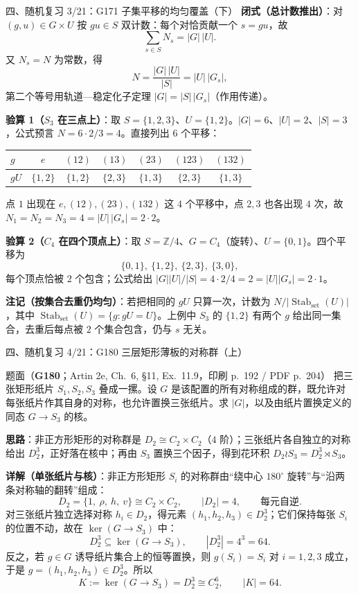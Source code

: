 \documentclass[aspectratio=169,10pt,fontset=none]{ctexbeamer}
\newcommand{\ex}[1]{\textcolor{accent}{\footnotesize\bfseries #1}}
\newcommand{\key}[1]{\textcolor{ink}{\bfseries #1}}
\begin{document}
\begin{frame}[t]{四、随机复习 3/21：G171 子集平移的均匀覆盖（下）}
\scriptsize
\key{闭式（总计数推出）}：对 $(g,u)\in G\times U$ 按 $gu\in S$ 双计数：每个对恰贡献一个 $s=gu$，故
\[ \sum_{s\in S}N_s=|G|\,|U|. \]
又 $N_s=N$ 为常数，得
\[ N=\frac{|G|\,|U|}{|S|}=|U|\,|G_s|, \]
第二个等号用轨道—稳定化子定理 $|G|=|S|\,|G_s|$（作用传递）。

\key{验算 1（$S_3$ 在三点上）}：取 $S=\{1,2,3\}$、$U=\{1,2\}$。$|G|=6$、$|U|=2$、$|S|=3$，公式预言 $N=6\cdot2/3=4$。直接列出 $6$ 个平移：
\begin{center}
{\scriptsize
\begin{tabular}{@{}lcccccc@{}}
\toprule
$g$ & $e$ & $(12)$ & $(13)$ & $(23)$ & $(123)$ & $(132)$\\ \midrule
$gU$ & $\{1,2\}$ & $\{1,2\}$ & $\{2,3\}$ & $\{1,3\}$ & $\{2,3\}$ & $\{1,3\}$\\
\bottomrule
\end{tabular}}
\end{center}
点 $1$ 出现在 $e,(12),(23),(132)$ 这 $4$ 个平移中，点 $2,3$ 也各出现 $4$ 次，故 $N_1=N_2=N_3=4=|U|\,|G_s|=2\cdot2$。

\key{验算 2（$C_4$ 在四个顶点上）}：取 $S=\mathbb Z/4$、$G=C_4$（旋转）、$U=\{0,1\}$。四个平移为
\[ \{0,1\},\ \{1,2\},\ \{2,3\},\ \{3,0\}, \]
每个顶点恰被 $2$ 个包含；公式给出 $|G||U|/|S|=4\cdot2/4=2=|U||G_s|=2\cdot1$。

\key{注记（按集合去重仍均匀）}：若把相同的 $gU$ 只算一次，计数为 $N/|\operatorname{Stab}_{\mathrm{set}}(U)|$，其中 $\operatorname{Stab}_{\mathrm{set}}(U)=\{g:gU=U\}$。上例中 $S_3$ 的 $\{1,2\}$ 有两个 $g$ 给出同一集合，去重后每点被 $2$ 个集合包含，仍与 $s$ 无关。
\end{frame}

\begin{frame}[t]{四、随机复习 4/21：G180 三层矩形薄板的对称群（上）}
\label{ex:G180}
\scriptsize
\begin{block}{\footnotesize 题面（\ex{G180}；Artin 2e, Ch.~6, §11, Ex.~11.9，印刷 p.~192 / PDF p.~204）}
把三张矩形纸片 $S_1,S_2,S_3$ 叠成一摞。设 $G$ 是该配置的所有对称组成的群，既允许对每张纸片作其自身的对称，也允许置换三张纸片。求 $|G|$，以及由纸片置换定义的同态 $G\to S_3$ 的核。
\end{block}
\key{思路}：非正方形矩形的对称群是 $D_2\cong C_2\times C_2$（$4$ 阶）；三张纸片各自独立的对称给出 $D_2^3$，正好落在核中；再由 $S_3$ 置换三个因子，得到花环积 $D_2\wr S_3=D_2^3\rtimes S_3$。

\key{详解（单张纸片与核）}：非正方形矩形 $S_i$ 的对称群由“绕中心 $180^\circ$ 旋转”与“沿两条对称轴的翻转”组成：
\[ D_2=\{1,\ \rho,\ h,\ v\}\cong C_2\times C_2,\qquad |D_2|=4,\qquad \text{每元自逆}. \]
对三张纸片独立选择对称 $h_i\in D_2$，得元素 $(h_1,h_2,h_3)\in D_2^3$；它们保持每张 $S_i$ 的位置不动，故在 $\ker(G\to S_3)$ 中：
\[ D_2^3\subseteq\ker(G\to S_3),\qquad |D_2^3|=4^3=64. \]
反之，若 $g\in G$ 诱导纸片集合上的恒等置换，则 $g(S_i)=S_i$ 对 $i=1,2,3$ 成立，于是 $g=(h_1,h_2,h_3)\in D_2^3$。所以
\[ K:=\ker(G\to S_3)=D_2^3\cong C_2^6,\qquad |K|=64. \]
\end{frame}
\end{document}
